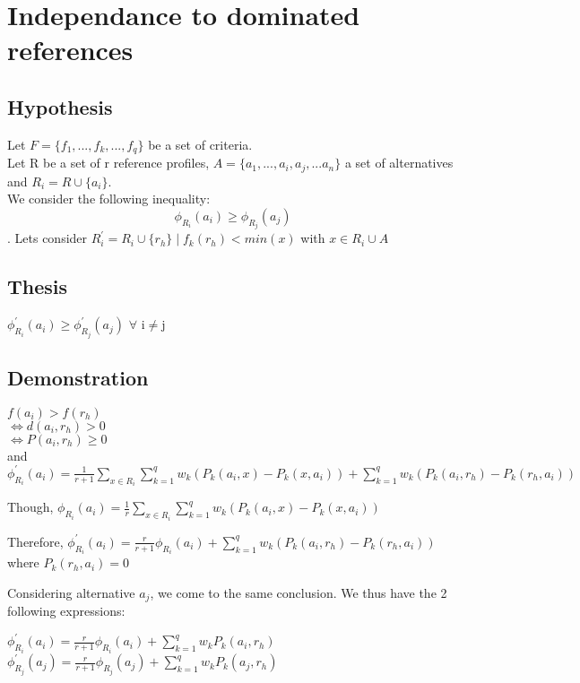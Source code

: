 \documentclass{article}
\begin{document}
\section{Independance to dominated references}

\subsection{Hypothesis}

Let $F=\{f_1,...,f_k,...,f_q\}$ be a set of criteria.\\
Let R be a set of r reference profiles, $A=\{a_1,...,a_i,a_j,...a_n\}$ a set of alternatives and $R_i=R\cup\{a_i\}$.\\
We consider the following inequality: \[\phi_{R_i}(a_i)\geq\phi_{R_j}(a_j)\].
Lets consider $R_{i}^{'}=R_i\cup\{r_h\}\mid f_k(r_h)<min(x)$ with $x\in R_i\cup A$

\subsection{Thesis}

$\phi_{R_i}^{'}(a_i)\geq\phi_{R_j}^{'}(a_j)$ $\forall$ i$\neq$j

\subsection{Demonstration}

$f(a_i)>f(r_h)$\\
$\iff d(a_i,r_h)>0$\\
$\iff P(a_i,r_h)\geq0$\\
and $\phi_{R_i}^{'}(a_i)=\frac{1}{r+1}\sum\limits_{x\in R_{i}}^{} \sum\limits_{k=1}^q w_k (P_k(a_i,x)-P_k(x,a_i)) + \sum\limits_{k=1}^q w_k (P_k(a_i,r_h)-P_k(r_h,a_i))$\linebreak

Though, $\phi_{R_i}(a_i)=\frac{1}{r}\sum\limits_{x\in R_{i}}^{} \sum\limits_{k=1}^q w_k (P_k(a_i,x)-P_k(x,a_i))$\linebreak

Therefore, $\phi_{R_i}^{'}(a_i)=\frac{r}{r+1}\phi_{R_i}(a_i)+\sum\limits_{k=1}^q w_k (P_k(a_i,r_h)-P_k(r_h,a_i))$\\
where $P_k(r_h,a_i)=0$\linebreak

Considering alternative $a_j$, we come to the same conclusion. We thus have the 2 following expressions:\linebreak

$\phi_{R_i}^{'}(a_i)=\frac{r}{r+1}\phi_{R_i}(a_i)+\sum\limits_{k=1}^q w_k P_k(a_i,r_h)$\\
$\phi_{R_j}^{'}(a_j)=\frac{r}{r+1}\phi_{R_j}(a_j)+\sum\limits_{k=1}^q w_k P_k(a_j,r_h)$\\
\end{document}
